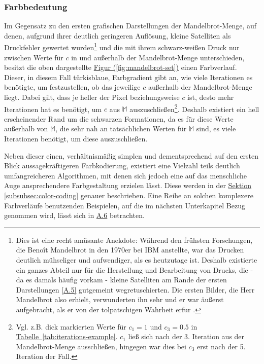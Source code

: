\subsubsection{Farbbedeutung}\label{subsubsec:color-meaning}

Im Gegensatz zu den ersten grafischen Darstellungen der Mandelbrot-Menge,
auf denen, aufgrund ihrer deutlich geringeren Auflösung,
kleine Satelliten als Druckfehler gewertet wurden\footnote{
  Dies ist eine recht amüsante Anekdote: Während den frühsten Forschungen,
  die Benoît Mandelbrot in den 1970er bei IBM anstellte, war das Drucken deutlich
  mühseliger und aufwendiger, als es heutzutage ist.
  Deshalb existierte ein ganzes Abteil nur für die Herstellung und Bearbeitung von
  Drucks, die - da es damals häufig vorkam - kleine Satelliten am Rande der ersten
  Darstellungen \hyperref[app:5]{[A.5]} gutgemeint wegretuschierten.
  Die ersten Bilder, die Herr Mandelbrot also erhielt, verwunderten ihn sehr und
  er war äußerst aufgebracht, als er von der tolpatschigen Wahrheit erfur
  \cite{numberphile_whats_2019}.
}
und die mit ihrem schwarz-weißen Druck nur zwischen Werte für $c$ in
und außerhalb der Mandelbrot-Menge unterschieden,
besitzt die oben dargestellte
\hyperref[fig:mandelbrot-set]{Figur (\ref{fig:mandelbrot-set})}
einen Farbverlauf.
Dieser, in diesem Fall türkisblaue, Farbgradient gibt an,
wie viele Iterationen es benötigte,
um festzustellen, ob das jeweilige $c$ außerhalb der Mandelbrot-Menge liegt.
Dabei gilt, dass je heller der Pixel beziehungsweise $c$ ist, desto mehr
Iterationen hat es benötigt, um $c$ aus $\mathbb{M}$ auszuschließen\footnote{
  Vgl. z.B. dick markierten Werte für $c_1 = 1 \text{ und } c_3 = 0.5$ in
  \hyperref[tab:iterations-example]{Tabelle~\ref{tab:iterations-example}}.
  $c_1$ ließ sich nach der 3. Iteration aus der Mandelbrot-Menge ausschließen,
  hingegen war dies bei $c_3$ erst nach der 5. Iteration der Fall.
}.
Deshalb existiert ein hell erscheinender Rand um die schwarzen Formationen,
da es für diese Werte außerhalb von $\mathbb{M}$, die sehr nah an tatsächlichen
Werten für $\mathbb{M}$ sind, es viele Iterationen benötigt, um diese auszuschließen.

Neben dieser einen, verhältnismäßig simplen und dementsprechend auf den ersten
Blick aussagekräftigeren Farbkodierung, existiert eine Vielzahl teils deutlich
umfangreicheren Algorithmen, mit denen sich jedoch eine auf das menschliche Auge
ansprechendere Farbgestaltung erzielen lässt.
Diese werden in der \hyperref[subsubsec:color-coding]{Sektion \ref{subsubsec:color-coding}}
genauer beschrieben.
Eine Reihe an solchen komplexere Farbverläufe benutzenden Beispielen,
auf die im nächsten Unterkapitel Bezug genommen wird,
lässt sich in \hyperref[app:6]{A.6} betrachten.

